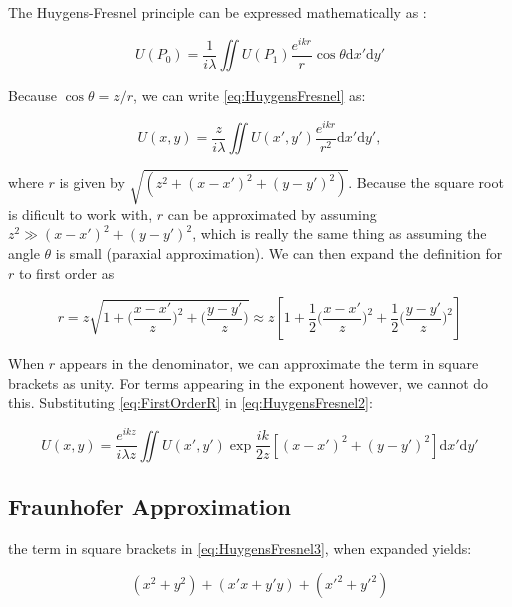 The Huygens-Fresnel principle can be expressed mathematically as \cite{Goodman2005}:

\begin{equation}\label{eq:HuygensFresnel}
	U(P_0) = \frac{1}{i \lambda} \iint U(P_1) \frac{e^{i k r}}{r} \cos{\theta} \text{d}x' \text{d}y'
\end{equation}

Because $\cos{\theta} = z/r$, we can write \ref{eq:HuygensFresnel} as:

\begin{equation}\label{eq:HuygensFresnel2}
	U(x,y) = \frac{z}{i \lambda} \iint U(x',y') \frac{e^{i k r}}{r^2} \text{d}x' \text{d}y',
\end{equation}

where $r$ is given by $\sqrt{(z^2 + (x-x')^2 +(y-y')^2)}$. Because the square root is dificult to work with, $r$ can be approximated by assuming $z^2 \gg (x-x')^2 + (y-y')^2$, which is really the same thing as assuming the angle $\theta$ is small (paraxial approximation). We can then expand the definition for $r$ to first order as

\begin{equation}\label{eq:FirstOrderR}
	r = z \sqrt{1+ \Big(\frac{x-x'}{z}\Big)^2 + \Big( \frac{y-y'}{z}\Big)} \approx z \left[ 1 + \frac{1}{2} \Big(\frac{x-x'}{z}\Big)^2 + \frac{1}{2} \Big( \frac{y-y'}{z} \Big)^2\right]
\end{equation}

When $r$ appears in the denominator, we can approximate the term in square brackets as unity. For terms appearing in the exponent however, we cannot do this. Substituting \cref{eq:FirstOrderR} in \cref{eq:HuygensFresnel2}:

\begin{equation}\label{eq:HuygensFresnel3}
	U(x,y) = \frac{e^{i k z}}{i \lambda z}\iint U(x',y') \exp{\frac{i k}{2 z} \left[(x-x')^2+(y-y')^2\right]} \text{d}x' \text{d}y'
\end{equation}

\subsection{Fraunhofer Approximation}

the term in square brackets in \cref{eq:HuygensFresnel3}, when expanded yields:

\begin{equation}
	(x^2+y^2) + (x'x+y'y)+(x'^2+y'^2)
\end{equation}


